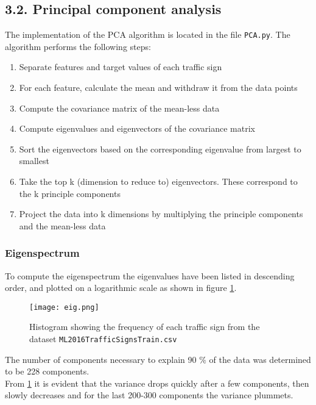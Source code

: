 \documentclass{article}
\begin{document}
\subsection{3.2. Principal component analysis}
The implementation of the PCA algorithm is located in the file \texttt{PCA.py}. The algorithm performs the following steps:
\begin{enumerate}
\item{Separate features and target values of each traffic sign}
\item{For each feature, calculate the mean and withdraw it from the data points}
\item{Compute the covariance matrix of the mean-less data}
\item{Compute eigenvalues and eigenvectors of the covariance matrix}
\item{Sort the eigenvectors based on the corresponding eigenvalue from largest to smallest}
\item{Take the top k (dimension to reduce to) eigenvectors. These correspond to the k principle components}
\item{Project the data into k dimensions by multiplying the principle components and the mean-less data}
\end{enumerate}
\subsubsection{Eigenspectrum}
To compute the eigenspectrum the eigenvalues have been listed in descending order, and plotted on a logarithmic scale as shown in figure \ref{fig:eig}.
\begin{figure}[H]
  \centering
  \texttt{[image: eig.png]}
  \caption{Histogram showing the frequency of each traffic sign from the dataset \texttt{ML2016TrafficSignsTrain.csv}}
  \label{fig:eig}
\end{figure}
The number of components necessary to explain 90 $\%$ of the data was determined to be 228 components. \\
From \ref{fig:eig} it is evident that the variance drops quickly after a few components, then slowly decreases and for the last 200-300 components the variance plummets.
\end{document}
